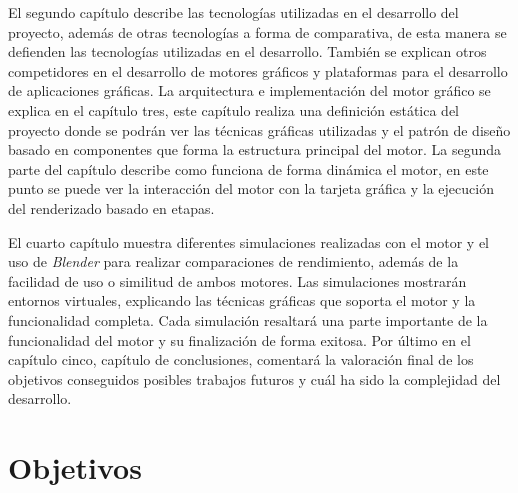 \documentclass[a4paper]{book}
\begin{document}
El segundo capítulo describe las tecnologías utilizadas en el desarrollo del proyecto, además de otras
tecnologías a forma de comparativa, de esta manera se defienden las tecnologías utilizadas en el desarrollo. También
se explican otros competidores en el desarrollo de motores gráficos y plataformas para el desarrollo de aplicaciones
gráficas. La arquitectura e implementación del motor gráfico se explica en el capítulo tres, este capítulo realiza 
una definición estática del proyecto donde se podrán ver las técnicas gráficas utilizadas y el patrón de diseño basado en
componentes que forma la estructura principal del motor. La segunda parte del capítulo describe como
funciona de forma dinámica el motor, en este punto se puede ver la interacción del motor con la tarjeta
gráfica y la ejecución del renderizado basado en etapas.

El cuarto capítulo muestra diferentes simulaciones realizadas con el motor y el uso de \textit{Blender} para realizar
comparaciones de rendimiento, además de la facilidad de uso o similitud de ambos motores. Las simulaciones mostrarán
entornos virtuales, explicando las técnicas gráficas que soporta el motor y la funcionalidad completa. Cada simulación
resaltará una parte importante de la funcionalidad del motor y su finalización de forma exitosa. Por último en el capítulo cinco,
capítulo de conclusiones, comentará la valoración final de los objetivos conseguidos posibles trabajos futuros y cuál ha sido la
complejidad del desarrollo.






\cleardoublepage
\chapter{Objetivos}
\label{chap:objetivos}
\end{document}
